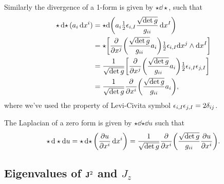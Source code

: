 \documentclass[10pt]{article}
\begin{document}
	Similarly the divergence of a 1-form is given by $\star\dd{\star}$, such that
	\begin{align*}
		\star\dd{\star} (a_i \dd{x^i}) &= \star\dd \pqty{a_i \thalf \eps_{i, I} \frac{\sqrt{\det g}}{g_{ii}} \dd{x^{I}}} \\
		&= \star \bqty{\pdv{x^j} \pqty{\frac{\sqrt{\det g}}{g_{ii}} a_i} \thalf \eps_{i, I} \dd x^j \wedge \dd{x^{I}}} \\
		&= \frac{1}{\sqrt{\det g}} \bqty{\pdv{x^j} \pqty{\frac{\sqrt{\det g}}{g_{ii}} a_i} \thalf \eps_{i, I} \eps_{j, I}} \\
		&= \frac{1}{\sqrt{\det g}} \pdv{x^i} \pqty{\frac{\sqrt{\det g}}{g_{ii}} a_i},
	\end{align*}
	where we've used the property of Levi-Civita symbol $\epsilon_{i, I} \epsilon_{j, I} = 2 \delta_{ij}$.

	The Laplacian of a zero form is given by $\star\dd{\star\dd{u}}$ such that
	\begin{equation}
		\star\dd{\star\dd{u}} = \star\dd{\star} \pqty{\pdv{u}{x^i} \dd{x^i}} \\
		= \frac{1}{\sqrt{\det g}} \pdv{x^i} \pqty{\frac{\sqrt{\det g}}{g_{ii}} \pdv{u}{x^i}}.
	\end{equation}

	\subsection{Eigenvalues of ${\bf J}^2$ and $J_z$}
\end{document}
